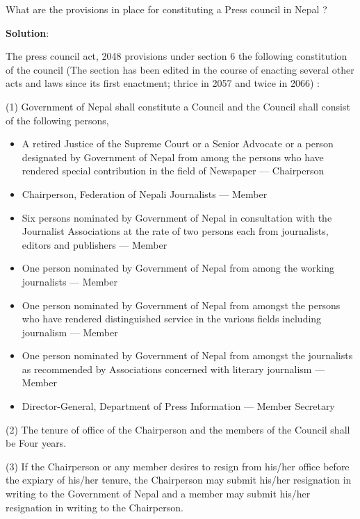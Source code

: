 \documentclass[
  openany]{book}
\newcommand{\question}{\item}
\newenvironment{solution}{ {\bfseries Solution}:}{}
\begin{document}
\begin{questions}
\question What are the provisions in place for constituting a Press council in Nepal ?

\begin{solution}

The press council act, 2048 provisions under section 6 the following constitution of the council (The section has been edited in the course of enacting several other acts and laws since its first enactment; thrice in 2057 and twice in 2066) :

(1) Government of Nepal shall constitute a Council and the Council shall consist of the following persons,

\begin{itemize}
\item A retired Justice of the Supreme Court or a Senior Advocate or a person designated by Government of Nepal from among the persons who have rendered special contribution in the field of Newspaper --- Chairperson
\item Chairperson, Federation of Nepali Journalists --- Member
\item Six persons nominated by Government of Nepal in consultation with the Journalist Associations at the rate of two persons each from journalists, editors and publishers --- Member
\item One person nominated by Government of Nepal from among the working journalists --- Member
\item One person nominated by Government of Nepal from amongst the persons who have rendered distinguished service in the various fields including journalism --- Member
\item One person nominated by Government of Nepal from  amongst the journalists as recommended by Associations concerned with literary journalism --- Member
\item Director-General, Department of Press Information --- Member Secretary
\end{itemize}

(2) The tenure of office of the Chairperson and the members of the Council shall be Four years.

(3) If the Chairperson or any member desires to resign from his/her office before the expiary of his/her tenure, the Chairperson may submit his/her resignation in writing to the Government of Nepal and a member may submit his/her resignation in writing to the Chairperson.

\end{solution}

\end{questions}
\end{document}
